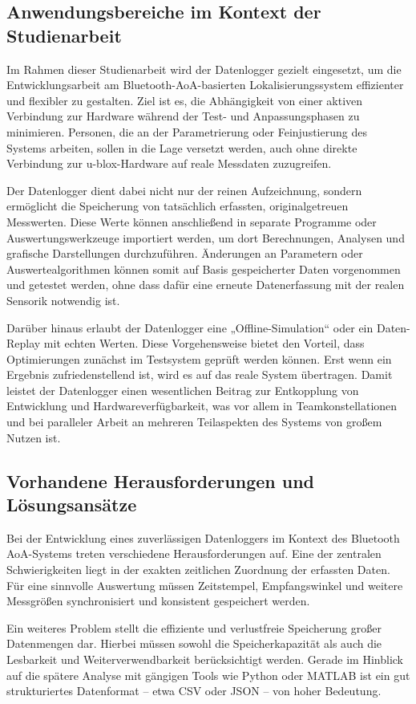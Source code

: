 \documentclass[a4paper, 12pt]{article} %
\begin{document}
\subsection{Anwendungsbereiche im Kontext der Studienarbeit}
Im Rahmen dieser Studienarbeit wird der Datenlogger gezielt eingesetzt, um die Entwicklungsarbeit am Bluetooth-\ac{AoA}-basierten
 Lokalisierungssystem effizienter und flexibler zu gestalten. Ziel ist es, die Abhängigkeit von einer aktiven Verbindung zur 
 Hardware während der Test- und Anpassungsphasen zu minimieren. Personen, die an der Parametrierung oder Feinjustierung des Systems
  arbeiten, sollen in die Lage versetzt werden, auch ohne direkte Verbindung zur u-blox-Hardware auf reale Messdaten zuzugreifen.

Der Datenlogger dient dabei nicht nur der reinen Aufzeichnung, sondern ermöglicht die Speicherung von tatsächlich erfassten, 
originalgetreuen Messwerten. Diese Werte können anschließend in separate Programme oder Auswertungswerkzeuge importiert werden,
 um dort Berechnungen, Analysen und grafische Darstellungen durchzuführen. Änderungen an Parametern oder Auswertealgorithmen können 
 somit auf Basis gespeicherter Daten vorgenommen und getestet werden, ohne dass dafür eine erneute Datenerfassung mit der realen Sensorik notwendig ist.

Darüber hinaus erlaubt der Datenlogger eine „Offline-Simulation“ oder ein Daten-Replay mit echten Werten. Diese Vorgehensweise bietet den 
Vorteil, dass Optimierungen zunächst im Testsystem geprüft werden können. Erst wenn ein Ergebnis zufriedenstellend ist, wird es auf das reale 
System übertragen. Damit leistet der Datenlogger einen wesentlichen Beitrag zur Entkopplung von Entwicklung und Hardwareverfügbarkeit, 
was vor allem in Teamkonstellationen und bei paralleler Arbeit an mehreren Teilaspekten des Systems von großem Nutzen ist.

\subsection{Vorhandene Herausforderungen und Lösungsansätze}
Bei der Entwicklung eines zuverlässigen Datenloggers im Kontext des Bluetooth \ac{AoA}-Systems treten verschiedene Herausforderungen auf. 
Eine der zentralen Schwierigkeiten liegt in der exakten zeitlichen Zuordnung der erfassten Daten. Für eine sinnvolle Auswertung müssen 
Zeitstempel, Empfangswinkel und weitere Messgrößen synchronisiert und konsistent gespeichert werden.

Ein weiteres Problem stellt die effiziente und verlustfreie Speicherung großer Datenmengen dar. 
Hierbei müssen sowohl die Speicherkapazität als auch die Lesbarkeit und Weiterverwendbarkeit berücksichtigt werden. Gerade 
im Hinblick auf die spätere Analyse mit gängigen Tools wie Python oder MATLAB ist ein gut strukturiertes Datenformat – etwa \ac{CSV} oder \ac{JSON} – von 
hoher Bedeutung.
\end{document}

